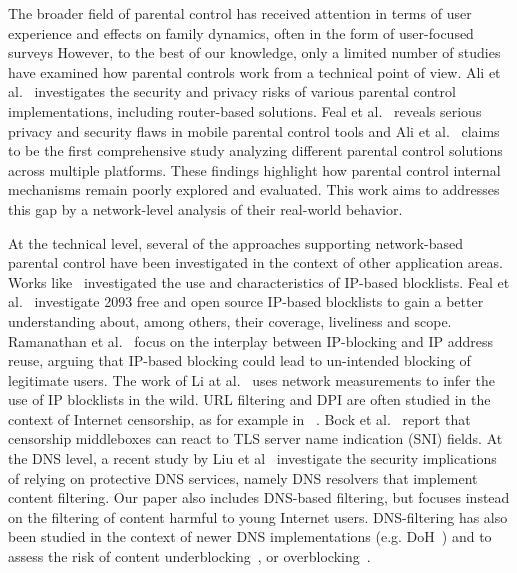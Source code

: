The broader field of parental control has received attention in terms of user experience and effects on family dynamics, often in the form of user-focused surveys \cite{stoilova_parental_2024,ardito_designing_2021,wang_protection_2021}
However, to the best of our knowledge, only a limited number of studies have examined how parental controls work from a technical point of view. 
Ali et al.~\cite{ali_parental_2021} investigates the security and privacy risks of various parental control implementations, including router-based solutions.
Feal et al.~\cite{feal_angel_2020} reveals serious privacy and security flaws in mobile parental control tools and Ali et al.~\cite{ali_betrayed_2020} claims to be the first comprehensive study analyzing different parental control solutions across multiple platforms.
These findings highlight how parental control internal mechanisms remain poorly explored and evaluated.
This work aims to addresses this gap by a network-level analysis of their real-world behavior.



At the technical level, several of the approaches supporting network-based parental control have been investigated in the context of other application areas.
Works like~\cite{feal-tnsm-2021, ramanathan-imc-2020, li-pam-2021, metcalf-wiscs-2015} investigated the use and characteristics of IP-based blocklists. Feal et al.~\cite{feal-tnsm-2021} investigate 2093 free and open source IP-based blocklists to gain a better understanding about, among others, their coverage, liveliness and scope. Ramanathan et al.~\cite{ramanathan-imc-2020} focus on the interplay between IP-blocking and IP address reuse, arguing that IP-based blocking could lead to un-intended blocking of legitimate users. The work of Li at al.~\cite{li-pam-2021} uses network measurements to infer the use of IP blocklists in the wild. URL filtering and DPI are often studied in the context of Internet censorship, as for example in ~\cite{rfc9505,bock-usenix-2021, dalek-imc-2013, mcdonald-imc-2018}. Bock et al.~\cite{bock-usenix-2021} report that censorship middleboxes can react to TLS server name indication (SNI) fields. At the DNS level, a recent study by Liu et al~\cite{liu-ndss-2024} investigate the security implications of relying on protective DNS services, namely DNS resolvers that implement content filtering. Our paper also includes DNS-based filtering, but focuses instead on the filtering of content harmful to young Internet users. DNS-filtering has also been studied in the context of newer DNS implementations (e.g. DoH~\cite{vekshin_doh_2020}) and to assess the risk of content underblocking~\cite{cheng_-depth_2022}, or overblocking~\cite{hoang_how_2021,hoang_measuring_2022}.



